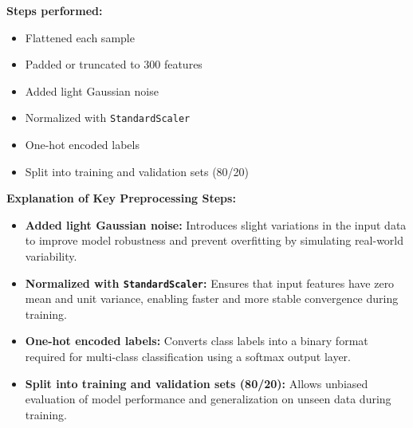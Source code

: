\documentclass[a4paper,12pt]{article}
\begin{document}
\textbf{Steps performed:}
\begin{itemize}
    \item Flattened each sample
    \item Padded or truncated to 300 features
    \item Added light Gaussian noise
    \item Normalized with \texttt{StandardScaler}
    \item One-hot encoded labels
    \item Split into training and validation sets (80/20)
\end{itemize}

\textbf{Explanation of Key Preprocessing Steps:}
\begin{itemize}
    \item \textbf{Added light Gaussian noise:} Introduces slight variations in the input data to improve model robustness and prevent overfitting by simulating real-world variability.
    
    \item \textbf{Normalized with \texttt{StandardScaler}:} Ensures that input features have zero mean and unit variance, enabling faster and more stable convergence during training.
    
    \item \textbf{One-hot encoded labels:} Converts class labels into a binary format required for multi-class classification using a softmax output layer.
    
    \item \textbf{Split into training and validation sets (80/20):} Allows unbiased evaluation of model performance and generalization on unseen data during training.
\end{itemize}
\end{document}
